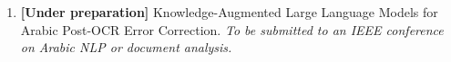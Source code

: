 
\begin{enumerate}
  \item \textbf{[Under preparation]} Knowledge-Augmented Large Language Models
        for Arabic Post-OCR Error Correction. \textit{To be submitted to an
        IEEE conference on Arabic NLP or document analysis.}
\end{enumerate}
